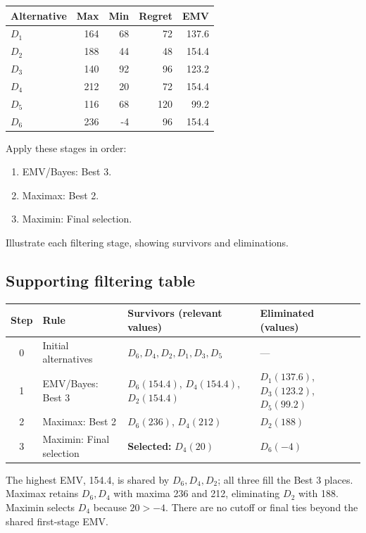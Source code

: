 \vspace{-3mm}
\begin{center}\small\setlength{\tabcolsep}{4pt}
	\begin{tabular}{lrrrr}\toprule
		Alternative & Max & Min & Regret & EMV\\ \midrule
		$D_1$ & 164 & 68 & 72 & 137.6\\
		$D_2$ & 188 & 44 & 48 & 154.4\\
		$D_3$ & 140 & 92 & 96 & 123.2\\
		$D_4$ & 212 & 20 & 72 & 154.4\\
		$D_5$ & 116 & 68 & 120 & 99.2\\
		$D_6$ & 236 & -4 & 96 & 154.4\\
		\bottomrule
	\end{tabular}
\end{center}
\vspace{-3mm}

Apply these stages in order:
\begin{enumerate}[leftmargin=*]
	\item EMV/Bayes: Best 3.
	\item Maximax: Best 2.
	\item Maximin: Final selection.
\end{enumerate}
Illustrate each filtering stage, showing survivors and eliminations.
\label{sol:q3table}
\subsection*{Supporting filtering table}
\begin{center}\small
\begin{tabularx}{\textwidth}{@{}c >{\raggedright\arraybackslash}p{} >{\raggedright\arraybackslash}X >{\raggedright\arraybackslash}p{}@{}}
\toprule
Step & Rule & Survivors (relevant values) & Eliminated (values)\\\midrule
0 & Initial alternatives & $D_6,D_4,D_2,D_1,D_3,D_5$ & ---\\
1 & EMV/Bayes: Best 3 & $D_6(154.4)$, $D_4(154.4)$, $D_2(154.4)$ & $D_1(137.6)$, $D_3(123.2)$, $D_5(99.2)$\\
2 & Maximax: Best 2 & $D_6(236)$, $D_4(212)$ & $D_2(188)$\\
3 & Maximin: Final selection & \textbf{Selected:} $D_4(20)$ & $D_6(-4)$\\
\bottomrule\end{tabularx}
\end{center}
The highest EMV, 154.4, is shared by $D_6,D_4,D_2$; all three fill the Best 3 places. Maximax retains $D_6,D_4$ with maxima 236 and 212, eliminating $D_2$ with 188. Maximin selects $D_4$ because $20>-4$. There are no cutoff or final ties beyond the shared first-stage EMV.
\secInicio[sec:q3]
\clearpage
{}\label{sol:q3tree}
